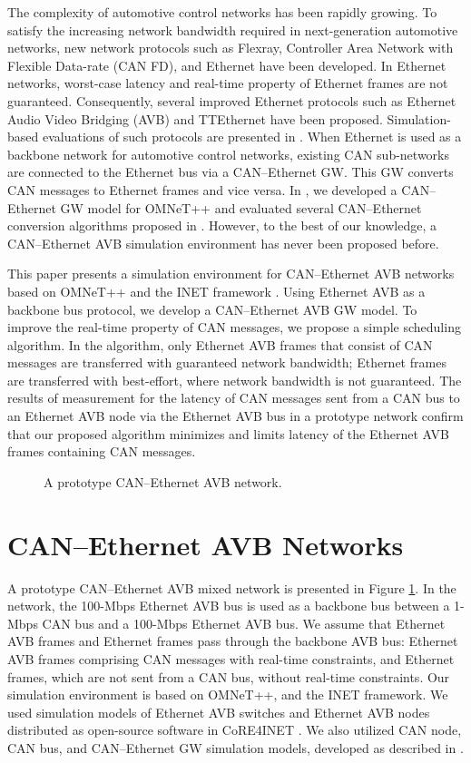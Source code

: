 \documentclass{sig-alternate}
\begin{document}
The complexity of automotive control networks has been rapidly
growing. To satisfy the increasing network bandwidth required in
next-generation automotive networks, new network protocols such as
Flexray, Controller Area Network with Flexible Data-rate (CAN FD), and
Ethernet have been developed. In Ethernet networks, worst-case latency
and real-time property of Ethernet frames are not
guaranteed. Consequently, several improved Ethernet protocols such as
Ethernet Audio Video Bridging (AVB) and TTEthernet have been
proposed. Simulation-based evaluations of such protocols are presented
in \cite{avb-tte2}. When Ethernet is used as a backbone network for
automotive control networks, existing CAN sub-networks are connected to
the Ethernet bus via a CAN--Ethernet GW. This GW converts CAN messages
to Ethernet frames and vice versa. In \cite{waters2013}, we developed a
CAN--Ethernet GW model for OMNeT++ \cite{omnetpp-hp} and evaluated
several CAN--Ethernet conversion algorithms proposed in
\cite{convert}. However, to the best of our knowledge, a CAN--Ethernet
AVB simulation environment has never been proposed before.

This paper presents a simulation environment for CAN--Ethernet AVB
networks based on OMNeT++ and the INET framework
\cite{inet-manual}. Using Ethernet AVB as a backbone bus protocol, we
develop a CAN--Ethernet AVB GW model. To improve the real-time property
of CAN messages, we propose a simple scheduling algorithm. In the
algorithm, only Ethernet AVB frames that consist of CAN messages are
transferred with guaranteed network bandwidth; Ethernet frames are
transferred with best-effort, where network bandwidth is not
guaranteed. The results of measurement for the latency of CAN messages
sent from a CAN bus to an Ethernet AVB node via the Ethernet AVB bus in
a prototype network confirm that our proposed algorithm minimizes and
limits latency of the Ethernet AVB frames containing CAN messages.

\begin{figure}
 \centering {}
 \caption{A prototype CAN--Ethernet AVB network.}  \label{network}
\end{figure}

\section{CAN--Ethernet AVB Networks}

A prototype CAN--Ethernet AVB mixed network is presented in Figure
\ref{network}. In the network, the 100-Mbps Ethernet AVB bus is used as
a backbone bus between a 1-Mbps CAN bus and a 100-Mbps Ethernet AVB
bus. We assume that Ethernet AVB frames and Ethernet frames pass through
the backbone AVB bus: Ethernet AVB frames comprising CAN messages with
real-time constraints, and Ethernet frames, which are not sent from a
CAN bus, without real-time constraints. Our simulation environment is
based on OMNeT++, and the INET framework. We used simulation models of
Ethernet AVB switches and Ethernet AVB nodes distributed as open-source
software in CoRE4INET \cite{core4inet}. We also utilized CAN node, CAN
bus, and CAN--Ethernet GW simulation models, developed as described in
\cite{waters2013}.
\end{document}
